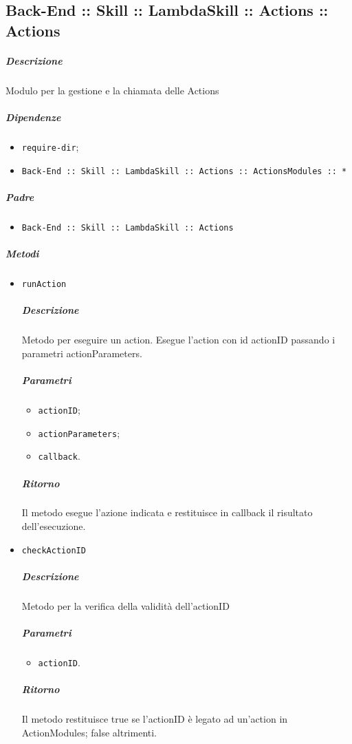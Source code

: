 \documentclass[../ManualeSviluppatore_v1.0.0.tex]{subfiles}
\begin{document}
\subsection{Back-End :: Skill :: LambdaSkill :: Actions :: Actions}
\subparagraph{Descrizione} Modulo per la gestione e la chiamata delle Actions
\subparagraph{Dipendenze}
\begin{itemize}
	\item \texttt{require-dir};
	\item \texttt{Back-End :: Skill :: LambdaSkill :: Actions :: ActionsModules :: *}
\end{itemize}
\subparagraph{Padre}
\begin{itemize}
	\item \texttt{Back-End :: Skill :: LambdaSkill :: Actions}
\end{itemize}
\subparagraph{Metodi}
\begin{itemize}
	\item \texttt{runAction}
	      \subparagraph{Descrizione} Metodo per eseguire un action. Esegue l'action con id actionID passando i parametri actionParameters.
	      \subparagraph{Parametri}
	      \begin{itemize}
	      	\item \texttt{actionID};
	      	\item \texttt{actionParameters};
	      	\item \texttt{callback}.
	      \end{itemize}
	      \subparagraph{Ritorno} Il metodo esegue l'azione indicata e restituisce in callback il risultato dell'esecuzione.
	\item \texttt{checkActionID}
	      \subparagraph{Descrizione} Metodo per la verifica della validità dell'actionID
	      \subparagraph{Parametri}
	      \begin{itemize}
	      	\item \texttt{actionID}.
	      \end{itemize}
	      \subparagraph{Ritorno} Il metodo restituisce true se l'actionID è legato ad un'action in ActionModules; false altrimenti.
\end{itemize}
\end{document}
